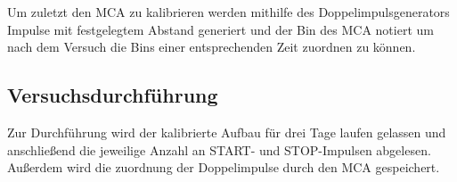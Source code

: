 Um zuletzt den MCA zu kalibrieren werden mithilfe des Doppelimpulsgenerators Impulse mit festgelegtem Abstand generiert und der Bin des MCA notiert um nach dem Versuch die Bins einer entsprechenden Zeit zuordnen zu können.

\subsection{Versuchsdurchführung}
Zur Durchführung wird der kalibrierte Aufbau für drei Tage laufen gelassen und anschließend die jeweilige Anzahl an START- und STOP-Impulsen abgelesen.
Außerdem wird die zuordnung der Doppelimpulse durch den MCA gespeichert.